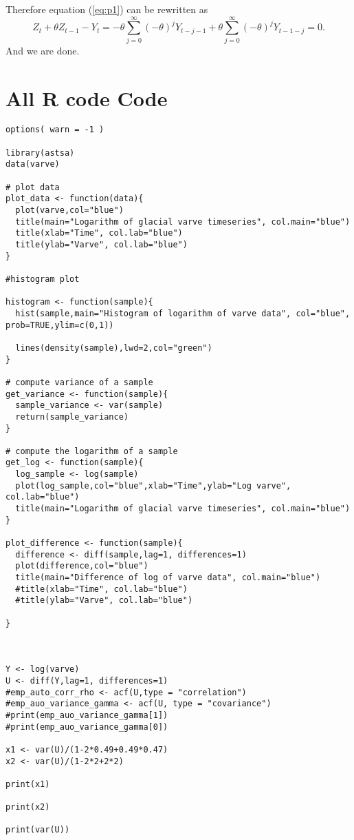 \documentclass[11pt, oneside]{article}   	%
\begin{document}
Therefore equation (\ref{eq:p1}) can be rewritten as
\begin{equation}
Z_{t} + \theta Z_{t-1} -Y_{t} = -\theta\sum_{j=0}^{\infty}(-\theta)^{j}Y_{t-j-1} + \theta \sum_{j=0}^{\infty}(-\theta)^{j}Y_{t-1-j}  = 0.
\end{equation}
And we are done.


\section{All R code Code}

\begin{lstlisting}
options( warn = -1 )

library(astsa)
data(varve)

# plot data
plot_data <- function(data){
  plot(varve,col="blue")
  title(main="Logarithm of glacial varve timeseries", col.main="blue")
  title(xlab="Time", col.lab="blue")
  title(ylab="Varve", col.lab="blue")
}

#histogram plot

histogram <- function(sample){
  hist(sample,main="Histogram of logarithm of varve data", col="blue", prob=TRUE,ylim=c(0,1))

  lines(density(sample),lwd=2,col="green")
}

# compute variance of a sample
get_variance <- function(sample){
  sample_variance <- var(sample)
  return(sample_variance)
}

# compute the logarithm of a sample
get_log <- function(sample){
  log_sample <- log(sample)
  plot(log_sample,col="blue",xlab="Time",ylab="Log varve", col.lab="blue")
  title(main="Logarithm of glacial varve timeseries", col.main="blue")
}

plot_difference <- function(sample){
  difference <- diff(sample,lag=1, differences=1)
  plot(difference,col="blue")
  title(main="Difference of log of varve data", col.main="blue")
  #title(xlab="Time", col.lab="blue")
  #title(ylab="Varve", col.lab="blue")

}



Y <- log(varve)
U <- diff(Y,lag=1, differences=1)
#emp_auto_corr_rho <- acf(U,type = "correlation")
#emp_auo_variance_gamma <- acf(U, type = "covariance")
#print(emp_auo_variance_gamma[1])
#print(emp_auo_variance_gamma[0])

x1 <- var(U)/(1-2*0.49+0.49*0.47)
x2 <- var(U)/(1-2*2+2*2)

print(x1)

print(x2)

print(var(U))

\end{lstlisting}
\end{document}
